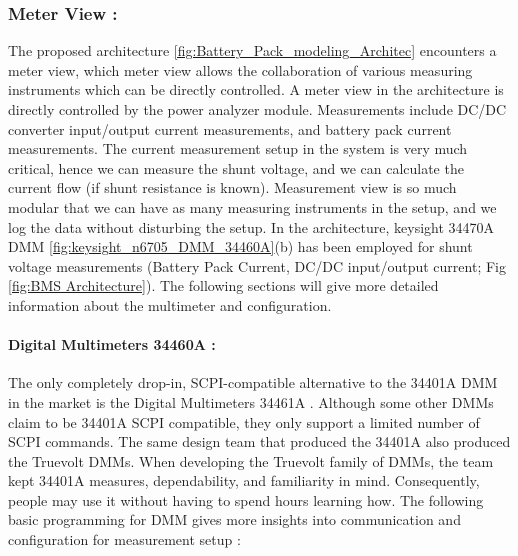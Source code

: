 \subsubsection{Meter View :}
The proposed architecture \ref{fig:Battery_Pack_modeling_Architec} encounters a meter view, which meter view allows the collaboration of various measuring instruments which can be directly controlled. A meter view in the architecture is directly controlled by the power analyzer module. Measurements include DC/DC converter input/output current measurements, and battery pack current measurements. The current measurement setup in the system is very much critical, hence we can measure the shunt voltage, and we can calculate the current flow (if shunt resistance is known). Measurement view is so much modular that we can have as many measuring instruments in the setup, and we log the data without disturbing the setup.
In the architecture, keysight 34470A DMM  \ref{fig:keysight_n6705_DMM_34460A}(b) has been employed for shunt voltage measurements (Battery Pack Current, DC/DC input/output current; Fig \ref{fig:BMS Architecture}). The following sections will give more detailed information about the multimeter and configuration.

\paragraph{Digital Multimeters 34460A :}


The only completely drop-in, SCPI-compatible alternative to the 34401A DMM in the market is the Digital Multimeters 34461A \cite{Keysight_34460A_DMM}. Although some other DMMs claim to be 34401A SCPI compatible, they only support a limited number of SCPI commands. The same design team that produced the 34401A also produced the Truevolt DMMs. When developing the Truevolt family of DMMs, the team kept 34401A measures, dependability, and familiarity in mind. Consequently, people may use it without having to spend hours learning how.
The following basic programming for DMM gives more insights into communication and configuration for measurement setup :

